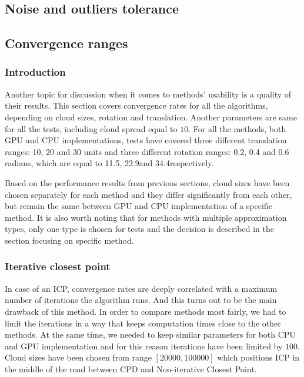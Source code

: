 \documentclass[titlepage]{article}
\begin{document}
\subsection{Noise and outliers tolerance}

\subsection{Convergence ranges}

\subsubsection{Introduction}
Another topic for discussion when it comes to methods' usability is a quality of their results. This section covers convergence rates for all the algorithms, depending on cloud sizes, rotation and translation. Another parameters are same for all the tests, including cloud spread equal to $10$. For all the methods, both GPU and CPU implementations, tests have covered three different translation ranges: 10, 20 and 30 units and three different rotation ranges: 0.2, 0.4 and 0.6 radians, which are equal to 11.5\degree, 22.9\degree and 34.4\degree respectively.

Based on the performance results from previous sections, cloud sizes have been chosen separately for each method and they differ significantly from each other, but remain the same between GPU and CPU implementation of a specific method. It is also worth noting that for methods with multiple approximation types, only one type is chosen for tests and the decision is described in the section focusing on specific method.

\subsubsection{Iterative closest point}
In case of an ICP, convergence rates are deeply correlated with a maximum number of iterations the algorithm runs. And this turns out to be the main drawback of this method. In order to compare methods most fairly, we had to limit the iterations in a way that keeps computation times close to the other methods. At the same time, we needed to keep similar parameters for both CPU and GPU implementation and for this reason iterations have been limited by $100$. Cloud sizes have been chosen from range $[20000,100000]$ which positions ICP in the middle of the road between CPD and Non-iterative Closest Point.
\end{document}
